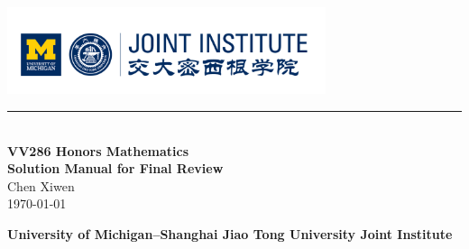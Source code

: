 \documentclass[12pt, a4paper]{article}
\newcommand{\HRule}{\rule{\linewidth}{0.5mm}}
\begin{document}
\renewcommand\arraystretch{1.5}
\setlength\parskip{.1\baselineskip}


\begin{titlepage}
  \begin{center}
  \includegraphics[width=0.7\textwidth]{./logo}\\
  \HRule\\[3cm]

  {\Huge\bfseries VV286 Honors Mathematics \uppercase\expandafter{}\\[0.5cm]Solution Manual for Final Review}\\[2cm]
  
  {\large Chen Xiwen}
  \\[1cm]
  {\large \today}
  \vfill

  \textbf{\small University of Michigan--Shanghai Jiao Tong University Joint Institute}
  \end{center}
\end{titlepage}


\newpage
\end{document}
